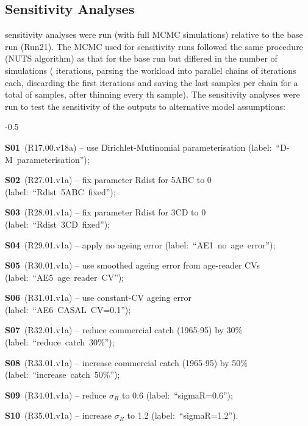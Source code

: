 \documentclass[11pt]{book}
\newcommand{\pc}{\%}
\begin{document}
\subsection{Sensitivity Analyses}\label{ss:sensruns} 


 sensitivity analyses were run (with full MCMC simulations) relative to the base run (Run21).
The MCMC used for sensitivity runs followed the same procedure (NUTS algorithm) as that for the base run but differed in the number of simulations (\nSimsSens{} iterations, parsing the workload into \nChains{} parallel chains of \cSimsSens{} iterations each, discarding the first \cBurnSens{} iterations and saving the last \cSampSens{} samples per chain for a total of \Nmcmc{} samples, after thinning every \nThinSens{}th sample).
The sensitivity analyses were run to test the sensitivity of the outputs to alternative model assumptions:
\begin{itemize_csas}{-0.5}{}
  \item \textbf{S01}~(R17.00.v18a)  -- use Dirichlet-Mutinomial parameterisation  (label:~``D-M~parameterisation'');
  \item \textbf{S02}~(R27.01.v1a)  -- fix parameter Rdist for 5ABC to 0  (label:~``Rdist~5ABC~fixed'');
  \item \textbf{S03}~(R28.01.v1a)  -- fix parameter Rdist for 3CD to 0  (label:~``Rdist~3CD~fixed'');
  \item \textbf{S04}~(R29.01.v1a)  -- apply no ageing error  (label:~``AE1~no~age~error'');
  \item \textbf{S05}~(R30.01.v1a)  -- use smoothed ageing error from age-reader CVs  (label:~``AE5~age~reader~CV'');
  \item \textbf{S06}~(R31.01.v1a)  -- use constant-CV ageing error  (label:~``AE6~CASAL~CV=0.1'');
  \item \textbf{S07}~(R32.01.v1a)  -- reduce commercial catch (1965-95) by 30\pc{}  (label:~``reduce~catch~30\pc{}'');
  \item \textbf{S08}~(R33.01.v1a)  -- increase commercial catch (1965-95) by 50\pc{}  (label:~``increase~catch~50\pc{}'');
  \item \textbf{S09}~(R34.01.v1a)  -- reduce $\sigma_R$ to 0.6  (label:~``sigmaR=0.6'');
  \item \textbf{S10}~(R35.01.v1a) -- increase $\sigma_R$ to 1.2 (label:~``sigmaR=1.2'').
\end{itemize_csas}
\end{document}

